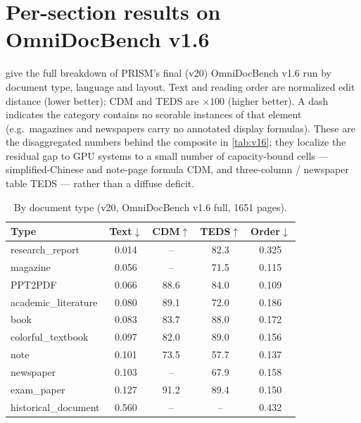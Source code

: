 \clearpage
\setcounter{page}{1}
\maketitlesupplementary

\section{Per-section results on OmniDocBench v1.6}
\label{sec:suppl_sections}

 give the full breakdown of PRISM's final (v20) OmniDocBench v1.6 run by document type, language and layout. Text and reading order are normalized edit distance (lower better); CDM and TEDS are $\times100$ (higher better). A dash indicates the category contains no scorable instances of that element (e.g.\ magazines and newspapers carry no annotated display formulas). These are the disaggregated numbers behind the composite in \cref{tab:v16}; they localize the residual gap to GPU systems to a small number of capacity-bound cells --- simplified-Chinese and note-page formula CDM, and three-column / newspaper table TEDS --- rather than a diffuse deficit.

\begin{table}[h]
\centering
\caption{By document type (v20, OmniDocBench v1.6 full, 1651 pages).}
\label{tab:suppl_type}
\small
\setlength{\tabcolsep}{4pt}
\begin{tabular}{lcccc}
\toprule
Type & Text$\downarrow$ & CDM$\uparrow$ & TEDS$\uparrow$ & Order$\downarrow$ \\
\midrule
research\_report     & 0.014 & --    & 82.3 & 0.325 \\
magazine             & 0.056 & --    & 71.5 & 0.115 \\
PPT2PDF              & 0.066 & 88.6  & 84.0 & 0.109 \\
academic\_literature & 0.080 & 89.1  & 72.0 & 0.186 \\
book                 & 0.083 & 83.7  & 88.0 & 0.172 \\
colorful\_textbook   & 0.097 & 82.0  & 89.0 & 0.156 \\
note                 & 0.101 & 73.5  & 57.7 & 0.137 \\
newspaper            & 0.103 & --    & 67.9 & 0.158 \\
exam\_paper          & 0.127 & 91.2  & 89.4 & 0.150 \\
historical\_document & 0.560 & --    & --   & 0.432 \\
\bottomrule
\end{tabular}
\end{table}

